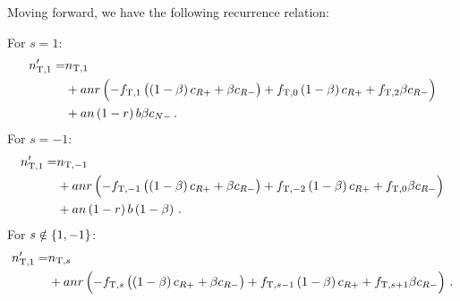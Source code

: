\documentclass{article}
\newcommand{\tT}{\text{T}}
\begin{document}
Moving forward, we have the following recurrence relation:

For $s = 1$:
%
\begin{align*}
    n^\prime_{\tT, 1}
        = &n_{\tT, 1} \\
          &+ a n r \del{
                - f_{\tT, 1} \del{\del{1 - \beta} c_{R +} + \beta c_{R -}}
                + f_{\tT, 0} \del{1 - \beta} c_{R +}
                + f_{\tT, 2} \beta c_{R -}
          } \\
          &+ a n \del{1 - r} b \beta c_{N -}
          \,.
\end{align*}
%
For $s = - 1$:
%
\begin{align*}
    n^\prime_{\tT, 1}
        = &n_{\tT, -1} \\
          &+ a n r \del{
            - f_{\tT, -1} \del{\del{1 - \beta} c_{R +} + \beta c_{R -}}
            + f_{\tT, -2} \del{1 - \beta} c_{R +}
            + f_{\tT, 0} \beta c_{R -}
          } \\
          &+ a n \del{1 - r} b \del{1 - \beta}
          \,.
\end{align*}
%
For $s \notin \cbr{1, -1}$:
%
\begin{align*}
    n^\prime_{\tT, 1}
        = &n_{\tT, s} \\
          &+ a n r \del{
              - f_{\tT, s} \del{\del{1 - \beta} c_{R +} + \beta c_{R -}}
              + f_{\tT, s - 1} \del{1 - \beta} c_{R +}
              + f_{\tT, s + 1} \beta c_{R -}
          }
          \,.
\end{align*}
\end{document}
